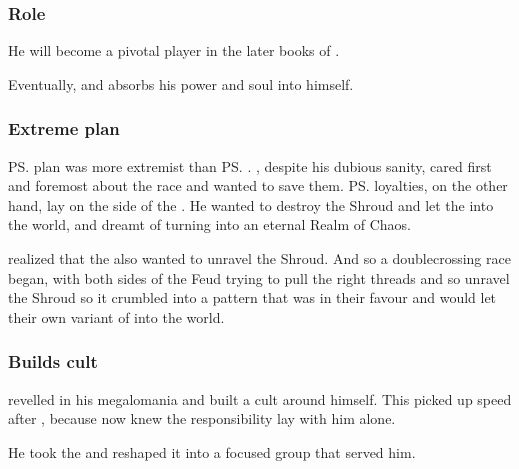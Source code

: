 \subsubsection{Role}
He will become a pivotal player in the later books of \SentinelsofMith.

Eventually,  and \Vizsherioch{} absorbs his power and soul into himself. 





\subsubsection{Extreme plan}
\ps{\Vizsherioch} plan was more extremist than \ps{\Secherdamon}. 
\Secherdamon{}, despite his dubious sanity, cared first and foremost about the \draconian{} race and wanted to save them. 
\ps{\Vizsherioch} loyalties, on the other hand, lay on the side of the \xss. 
He wanted to destroy the Shroud and let the \xss{} into the world, and dreamt of turning \Miith{} into an eternal Realm of Chaos. 

\Vizsherioch{} realized that the \banelords{} also wanted to unravel the Shroud. 
And so a doublecrossing race began, with both sides of the Feud trying to pull the right threads and so unravel the Shroud so it crumbled into a pattern that was in their favour and would let their own variant of  into the world. 





\subsubsection{Builds cult}

\Vizsherioch revelled in his megalomania and built a cult around himself.
This picked up speed after , because \Vizsherioch now knew the responsibility lay with him alone.

He took the  and reshaped it into a focused group that served him. 










